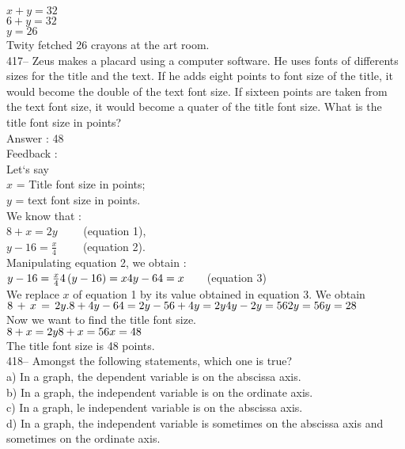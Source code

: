 \documentclass[letterpaper, 12pt]{article}
\begin{document}
$x+y=32$\\
$6+y=32$\\
$y=26$\\

Twity fetched 26 crayons at the art room.\\

417-- Zeus makes a placard using a computer software. He uses fonts of differents sizes for the title and the text.
  If he adds eight points to font size of the title, it would become the double of the text font size. If sixteen points are taken from the text font size, it would become a quater of the title font size. What is the title font size in points?\\

Answer : 48\\

Feedback : \\
Let`s say\\
$x$ = Title font size in points;\\
$y$ = text font size in points.\\

We know that : \\
$8+x=2y \qquad $ (equation 1),\\
$y-16=\frac{x}{4} \qquad$ (equation 2).\\

Manipulating equation 2, we obtain :\\
$y-16=\frac{x}{4}\\
4\left( y-16\right) =x\\
4y-64=x \qquad $(equation 3)\\

We replace $x$ of equation 1 by its value obtained in equation 3.
We obtain $8\,+\,x\,=\,2y.\\
8+4y-64=2y\\
-56+4y=2y\\
4y-2y=56\\
2y=56\\
y=28$\\

Now we want to find the title font size.\\
$8+x=2y\\
8+x=56\\
x=48$\\

The title font size is 48 points.\\


418-- Amongst the following statements, which one is true?\\
a) In a graph, the dependent variable is on the abscissa axis.\\
b) In a graph, the independent variable is on the ordinate axis.\\
c) In a graph, le independent variable is on the abscissa axis.\\
d) In a graph, the independent variable is sometimes on the abscissa axis and sometimes on the ordinate axis.\\
\end{document}
